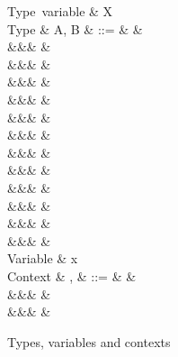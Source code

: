 \begin{figure}[H] %
\begin{syntaxfig}
\mbox{Type variable}
&
X
\\[2mm]
\mbox{Type}
&
A, B
&
::=
&
&
\\
&&&
\tyUnit
&
\\
&&&
&
\\
&&&
&
\\
&&&
&
\\
&&&
&
\\
&&&
&
\\
&&&
&
\\
&&&
&
\\
&&&
&
\\
&&&
&
\\
&&&
&
\\
&&&
&
\\[2mm]
\mbox{Variable}
&
x
\\[2mm]
\mbox{Context}
&
\Gamma, \Delta
&
::=
&
\cxtEmpty
&
\\
&&&
&
\\
&&&
&
\end{syntaxfig}
\caption{Types, variables and contexts}
\end{figure}
